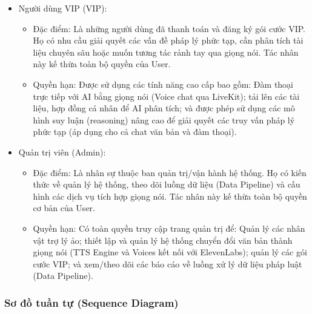\begin{itemize}
\item Người dùng VIP (VIP):
\begin{itemize}

\item Đặc điểm: Là những người dùng đã thanh toán và đăng ký gói cước VIP. Họ có nhu cầu giải quyết các vấn đề pháp lý phức tạp, cần phân tích tài liệu chuyên sâu hoặc muốn tương tác rảnh tay qua giọng nói. Tác nhân này kế thừa toàn bộ quyền của User.

\item Quyền hạn: Được sử dụng các tính năng cao cấp bao gồm: Đàm thoại trực tiếp với AI bằng giọng nói (Voice chat qua LiveKit); tải lên các tài liệu, hợp đồng cá nhân để AI phân tích; và được phép sử dụng các mô hình suy luận (reasoning) nâng cao để giải quyết các truy vấn pháp lý phức tạp (áp dụng cho cả chat văn bản và đàm thoại).

\end{itemize}
\newpage
\item Quản trị viên (Admin):
\begin{itemize}

\item Đặc điểm: Là nhân sự thuộc ban quản trị/vận hành hệ thống. Họ có kiến thức về quản lý hệ thống, theo dõi luồng dữ liệu (Data Pipeline) và cấu hình các dịch vụ tích hợp giọng nói. Tác nhân này kế thừa toàn bộ quyền cơ bản của User.

\item Quyền hạn: Có toàn quyền truy cập trang quản trị để: Quản lý các nhân vật trợ lý ảo; thiết lập và quản lý hệ thống chuyển đổi văn bản thành giọng nói (TTS Engine và Voices kết nối với ElevenLabs); quản lý các gói cước VIP; và xem/theo dõi các báo cáo về luồng xử lý dữ liệu pháp luật (Data Pipeline).

\end{itemize}
\end{itemize}


\newpage
\subsubsection{Sơ đồ tuần tự (Sequence Diagram)}
\lipsum[1]




